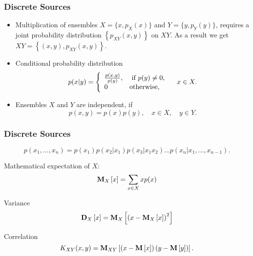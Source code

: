 \documentclass[14pt]{beamer}
\begin{document}
\begin{frame}
\frametitle{Discrete Sources}
\begin{itemize}

    \item Multiplication of ensembles $X= \{x,p_X (x)\}$ and $Y = \{y,p_Y (y)\}$, requires a joint probability distribution $\left\{ {p_{XY} (x,y)} \right\}$ on $XY$. As a result we get $XY = \left\{{(x,y),p_{XY}(x,y)} \right\}$.
    
    \item Conditional probability distribution
    \[
    p(x\vert y) = \left\{ {{\begin{array}{*{20}c}
     {\frac{p(x,y)}{p(y)},} \hfill & {\mbox{ if }p(y) \ne 0,} \hfill \\
     0 \hfill & {\mbox{otherwise,}} \hfill \\
    \end{array} }} \right.
    \quad
    x \in X.
    \]
    
    \item Ensembles $X$ and $Y$ are independent, if
    \[
    p(x,y) = p(x)p(y),
    \quad
    x \in X,
    \quad
    y \in Y.
    \]    
\end{itemize}
\end{frame}



\begin{frame}
\frametitle{Discrete Sources}
\begin{itemize}
\small{

    \item 
    \[
    p(x_1 ,...,x_n ) = p(x_1 )p(x_2 \vert x_1 )p(x_3 \vert x_1 x_2 ) ... p(x_n \vert x_1 ,...,x_{n - 1} ).
    \]

    \item Mathematical expectation of $X$:
    \[
    {\rm {\bf M}}_X \left[ x \right] = \sum\limits_{x \in X} {xp(x)}
    \]
    
    \item Variance
    \[
    {\rm {\bf D}}_X \left[ x \right] = {\rm {\bf M}}_X \left[ {\left( {x - {\rm
    {\bf M}}_X \left[ x \right]} \right)^2} \right]
    \]
    
    \item Correlation
    \[
    K_{XY} (x,y) = {\rm {\bf M}}_{XY} \left[ {\left( {x - {\rm {\bf M}}\left[ x
    \right]} \right)\left( {y - {\rm {\bf M}}\left[ y \right]} \right)}
    \right].
    \]
} 
\end{itemize}
\end{frame}
\end{document}
